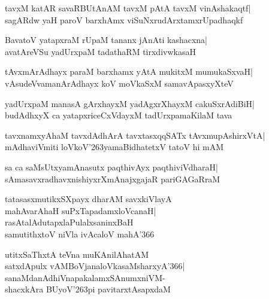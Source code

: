 \documentclass[twoside,12pt,openright]{book}
\def\S{\char'263}
\newcounter{shloka}[chapter]
\begin{document}
\begin{shloka}%
tavxM katAR savaRBUtAnAM tavxM pAtA tavxM vinAshakaqtf|\\
sagARdw yaH paroV barxhAmx viSuNxrudArxtamxrUpadhaqkf
\end{shloka}

\begin{shloka}%
BavatoV yatapxraM rUpaM tananx jAnAti kashacxna|\\
avatAreVSu yadUrxpaM tadathaRM tirxdivwkasaH
\end{shloka}

\begin{shloka}%
tAvxmArAdhayx paraM barxhamx yAtA mukitxM mumukaSxvaH|\\
vAsudeVvamanArAdhayx koV moVkaSxM samavApasxyXteV
\end{shloka}

\begin{shloka}%
yadUrxpaM manasA gArxhayxM yadAgxrXhayxM cakuSxrAdiBiH|\\
budAdhxyX ca yatapxriceCxVdayxM tadUrxpamaKilaM tava
\end{shloka}

\begin{shloka}%
tavxnamxyAhaM tavxdAdhArA tavxtasxqqSATx tAvxmupAshirxVtA|\\
mAdhaviVmiti loVkoV\S yamaBidhatetxV tatoV hi mAM
\end{shloka}

\begin{shloka}%
sa ca saMsUtxyamAnasutx paqthivAyx paqthiviVdharaH|\\
sAmasavxradhavxnishiyxrXmAnajxgajaR pariGAGaRraM
\end{shloka}

\begin{shloka}%
tatasasxmutikxSXpayx dharAM savxkiVlayA\\
mahAvarAhaH suPxTapadamxloVcanaH|\\
rasAtalAdutapxlaPulalxsaninxBaH\\
samutithxtoV niVla ivAcaloV mahA\char'366
\end{shloka}

\begin{shloka}%
utitxSaThxtA teVna muKAnilAhatAM\\
satxdApulx vAMBoVjanaloVkasaMsharxyA\char'366|\\
sanaMdanAdhiVnapakalamxSAnumxniVM-\\
shacxkAra BUyoV\S pi pavitarxtAsapxdaM
\end{shloka}
\end{document}
